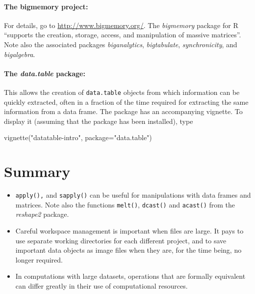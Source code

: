 \documentclass{tufte-book}\usepackage[]{graphicx}\usepackage[]{color}
\newcommand{\txtt}[1]{\texttt{#1}}
\begin{document}
\paragraph{The bigmemory project:} For details, go to
\url{http://www.bigmemory.org/}. The {\em bigmemory} package for R
``supports the creation, storage, access, and manipulation of massive
matrices''. Note also the associated packages {\em biganalytics}, {\em bigtabulate},
{\em synchronicity}, and {\em bigalgebra}.

\paragraph{The \textit{data.table} package:}
This allows the creation
of \txtt{data.table} objects from which information can be quickly
extracted, often in a fraction of the time required for extracting the
same information from a data frame.  The package has an accompanying
vignette.  To display it (assuming that the package has been
installed), type
\begin{Schunk}
\begin{Sinput}
vignette("datatable-intro", package="data.table")
\end{Sinput}
\end{Schunk}

\section{Summary}
\begin{itemize}
\item[] \txtt{apply(),} and \txtt{sapply()} can be useful for
  manipulations with data frames and matrices.  Note also the
  functions \txtt{melt()}, \txtt{dcast()} and \txtt{acast()} from the
  \textit{reshape2} package.

\item[] Careful workspace management is important when files
are large.  It pays to use separate working directories for each
different project, and to save important data objects as image files
when they are, for the time being, no longer required.

\item[] In computations with large datasets, operations that
are formally equivalent can differ greatly in their use of
computational resources.

\end{itemize}
% 
\cleartooddpage
\end{document}
